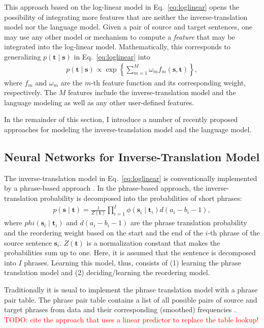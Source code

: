 \documentclass[11pt, oneside]{essay}
\newcommand{\vect}[1]{\mathbf{#1}}
\newcommand{\vs}[0]{\vect{s}}
\newcommand{\vt}[0]{\vect{t}}
\newcommand{\tred}[1]{\textcolor{red}{#1}}
\begin{document}
This approach based on the log-linear model in
Eq.~\eqref{eq:loglinear} opens the possibility of integrating
more features that are neither the inverse-translation model nor
the language model. Given a pair of source and target sentences,
one may use any other model or mechanism to compute a
\textit{feature} that may be integrated into the log-linear
model. Mathematically, this corresponds to generalizing $p(\vt
\mid \vs)$ in Eq.~\eqref{eq:loglinear} into
\begin{align}
\label{eq:loglinear_general}
    p(\vt \mid \vs) \propto \exp\left\{  
    \sum_{m=1}^M \omega_m f_m(\vs, \vt)
    \right\}, 
\end{align}
where $f_m$ and $\omega_m$ are the $m$-th feature function and
its corresponding weight, respectively. The $M$ features include
the inverse-translation model and the language modeling as well
as any other user-defined features.

In the remainder of this section, I introduce a number of
recently proposed approaches for modeling the
inverse-translation model and the language model.

\subsection{Neural Networks for Inverse-Translation Model}
\label{sec:nntm}

The inverse-translation model in Eq.~\eqref{eq:loglinear} is conventionally
implemented by a phrase-based approach \citep[see,
e.g.,][]{Koehn2003,Marcu2002}.  In the phrase-based approach, the
inverse-translation probability is decomposed into the
probabilities of short phrases:
\begin{align}
\label{eq:phrase_decomp}
    p(\vs \mid \vt) = \frac{1}{Z(\vt)} \prod_{i=1}^{I} \phi(\vs_i \mid \vt_i) d(a_i -
    b_i -1),
\end{align}
where $phi(\vs_i \mid \vt_i)$ and $d(a_i - b_i - 1)$ are the
phrase translation probability and the reordering weight based on
the start and the end of the $i$-th phrase of the source sentence
$\vs_i$. $Z(\vt)$ is a normalization constant that makes the
probabilities sum up to one. Here, it is assumed that the
sentence is decomposed into $I$ phrases. Learning this model,
thus, consists of (1) learning the phrase translation model and
(2) deciding/learning the reordering model.  

Traditionally it is usual to implement the phrase translation
model with a phrase pair table. The phrase pair table contains a
list of all possible pairs of source and target phrases from data
and their corresponding (smoothed) frequencies \citep[see,
e.g.,][]{Koehn2003,Koehn2010}. \tred{TODO: cite the approach that
uses a linear predictor to replace the table lookup!}
\end{document}
